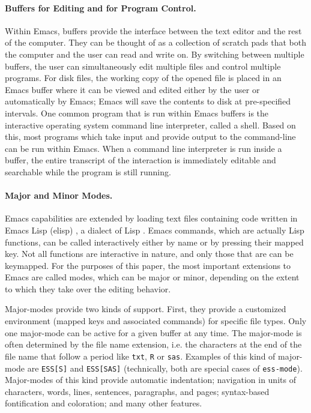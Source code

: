 \documentclass{article}
\newcommand{\stexttt}[1]{{\small\texttt{#1}}}
\begin{document}
\paragraph{Buffers for Editing and for Program Control.}
Within Emacs, buffers provide the interface between the text editor
and the rest of the computer.  They can be thought of as a collection
of scratch pads that both the computer and the user can read and write
on.  By switching between multiple buffers, the user can
simultaneously edit multiple files and control multiple programs.  For
disk files, the working copy of the opened file is placed in an Emacs
buffer where it can be viewed and edited either by the user or
automatically by Emacs; Emacs will save the contents to disk at
pre-specified intervals.  One common program that is run within Emacs
buffers is the interactive operating system command line interpreter,
called a shell.  Based on this, most programs which take input and
provide output to the command-line can be run within Emacs.  When a
command line interpreter is run inside a buffer, the entire transcript
of the interaction is immediately editable and searchable while the
program is still running.

\paragraph{Major and Minor Modes.}
Emacs capabilities are extended by loading text files containing code
written in Emacs Lisp (elisp) \citep{RChassell1999}, a dialect of Lisp
\citep{PGraham:1996}.  Emacs commands, which are actually Lisp
functions, can be called interactively either by name or by pressing
their mapped key.  Not all functions are interactive in nature, and
only those that are can be keymapped.  For the purposes of this paper,
the most important extensions to Emacs are called modes, which can be
major or minor, depending on the extent to which they take over the
editing behavior.

Major-modes provide two kinds of support.  First, they provide a
customized environment (mapped keys and associated commands) for
specific file types.  Only one major-mode can be active for a given
buffer at any time.  The major-mode is often determined by the file
name extension, i.e. the characters at the end of the file name that
follow a period like \stexttt{txt}, \stexttt{R} or \stexttt{sas}.
Examples of this kind of major-mode are \stexttt{ESS[S]} and
\stexttt{ESS[SAS]} (technically, both are special cases of
\stexttt{ess-mode}).  Major-modes of this kind provide automatic
indentation; navigation in units of characters, words, lines,
sentences, paragraphs, and pages; syntax-based fontification and
coloration; and many other features.
\end{document}

